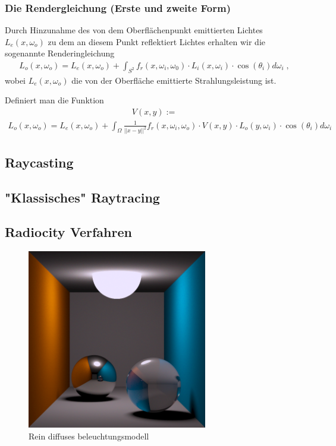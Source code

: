  
\subsubsection{Die Rendergleichung (Erste und zweite Form)}

Durch Hinzunahme des von dem Oberflächenpunkt emittierten Lichtes $L_e(x, \omega_o)$ zu dem   an diesem Punkt reflektiert Lichtes erhalten wir die sogenannte Renderingleichung 
\begin{align}
L_o(x, \omega_o) = L_e(x, \omega_o)  + \displaystyle \int_{S^2}f_r (x, \omega_i, \omega_0) \cdot L_i(x, \omega_i)  \cdot  \cos(\theta_i) d\omega_i \; ,
\end{align}
wobei $L_e(x, \omega_o)$ die von der Oberfläche emittierte Strahlungsleistung ist. 

Definiert man die Funktion 
\begin{align}
V(x,y) := 
\end{align}
\begin{align}
L_o(x, \omega_o) = L_e(x, \omega_o)  + \displaystyle \int_{\Omega}  \frac{1}{||x -y||^2}f_r (x, \omega_i, \omega_o) \cdot V(x,y) \cdot  L_o(y, \omega_i)  \cdot  \cos(\theta_i) d\omega_i 
\end{align}


\subsection{Raycasting}
\subsection{"Klassisches" Raytracing}
\subsection{Radiocity Verfahren}
 \begin{figure}[H]
    \centering
    \includegraphics[width=0.7\textwidth]{images/diffus.png}
    \caption{Rein diffuses beleuchtungsmodell}
    \label{fig:diffus}
\end{figure}

